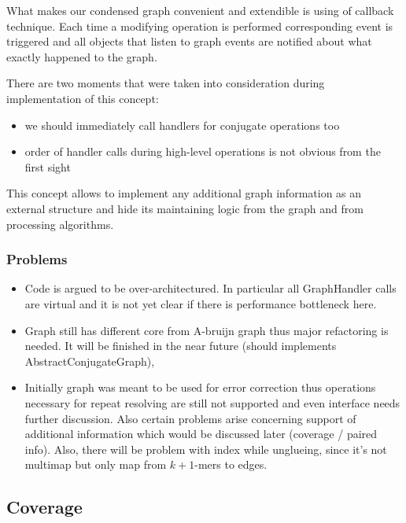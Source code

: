 \documentclass[12pt]{article}
\begin{document}

What makes our condensed graph convenient and extendible is using of callback technique. Each time a modifying operation is performed corresponding event is triggered and all objects that listen to graph events are notified about what exactly happened to the graph.

There are two moments that were taken into consideration during implementation of this concept:
\begin{itemize}
\item we should immediately call handlers for conjugate operations too
\item order of handler calls during high-level operations is not obvious from the first sight
\end{itemize}

This concept allows to implement any additional graph information as an external structure and hide its maintaining logic from the graph and from processing algorithms. 

\subsubsection{Problems}
\begin{itemize}
\item Code is argued to be over-architectured. In particular all GraphHandler calls are virtual and it is not yet clear if there is performance bottleneck here.
\item Graph still has different core from A-bruijn graph thus major refactoring is needed. It will be finished in the near future (should implements AbstractConjugateGraph),
\item Initially graph was meant to be used for error correction thus operations necessary for repeat resolving are still not supported and even interface needs further discussion. Also certain problems arise concerning support of additional information which would be discussed later (coverage / paired info). Also, there will be problem with index while unglueing, since it's not multimap but only map from $k+1$-mers to edges.
\end{itemize}

\subsection{Coverage}
\end{document}
